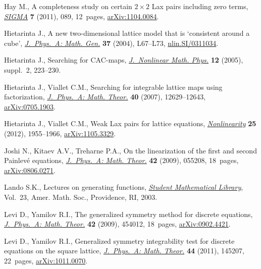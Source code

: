 \documentclass[pdftex]{sigma}
\numberwithin{equation}{section}
\begin{document}
\begin{thebibliography}{99}
Hay M., A completeness study on certain {$2\times 2$} {L}ax pairs including
 zero terms, \href{https://doi.org/10.3842/SIGMA.2011.089}{\textit{SIGMA}} \textbf{7} (2011), 089, 12~pages,
 \href{https://arxiv.org/abs/1104.0084}{arXiv:1104.0084}.

Hietarinta J., A new two-dimensional lattice model that is `consistent around a
 cube', \href{https://doi.org/10.1088/0305-4470/37/6/L01}{\textit{J.~Phys.~A: Math. Gen.}} \textbf{37} (2004), L67--L73,
 \href{https://arxiv.org/abs/nlin.SI/0311034}{nlin.SI/0311034}.

Hietarinta J., Searching for {CAC}-maps, \href{https://doi.org/10.2991/jnmp.2005.12.s2.16}{\textit{J.~Nonlinear Math. Phys.}}
 \textbf{12} (2005), suppl.~2, 223--230.

Hietarinta J., Viallet C.M., Searching for integrable lattice maps using
 factorization, \href{https://doi.org/10.1088/1751-8113/40/42/S09}{\textit{J.~Phys.~A: Math. Theor.}} \textbf{40} (2007),
 12629--12643, \href{https://arxiv.org/abs/0705.1903}{arXiv:0705.1903}.

Hietarinta J., Viallet C.M., Weak {L}ax pairs for lattice equations,
 \href{https://doi.org/10.1088/0951-7715/25/7/1955}{\textit{Nonlinearity}} \textbf{25} (2012), 1955--1966, \href{https://arxiv.org/abs/1105.3329}{arXiv:1105.3329}.

Joshi N., Kitaev A.V., Treharne P.A., On the linearization of the f\/irst and
 second {P}ainlev\'e equations, \href{https://doi.org/10.1088/1751-8113/42/5/055208}{\textit{J.~Phys.~A: Math. Theor.}} \textbf{42}
 (2009), 055208, 18~pages, \href{https://arxiv.org/abs/0806.0271}{arXiv:0806.0271}.

Lando S.K., Lectures on generating functions, \href{https://doi.org/10.1090/stml/023}{\textit{Student Mathematical
 Library}}, Vol.~23, Amer. Math. Soc., Providence, RI, 2003.

Levi D., Yamilov R.I., The generalized symmetry method for discrete equations,
 \href{https://doi.org/10.1088/1751-8113/42/45/454012}{\textit{J.~Phys.~A: Math. Theor.}} \textbf{42} (2009), 454012, 18~pages,
 \href{https://arxiv.org/abs/0902.4421}{arXiv:0902.4421}.

Levi D., Yamilov R.I., Generalized symmetry integrability test for discrete
 equations on the square lattice, \href{https://doi.org/10.1088/1751-8113/44/14/145207}{\textit{J.~Phys.~A: Math. Theor.}}
 \textbf{44} (2011), 145207, 22~pages, \href{https://arxiv.org/abs/1011.0070}{arXiv:1011.0070}.


\end{thebibliography}
\end{document}
